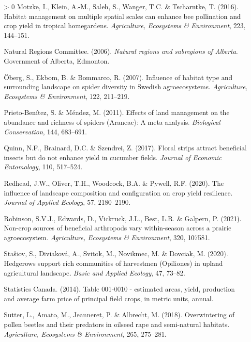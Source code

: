 \documentclass[]{elsarticle} %
\newlength{\cslhangindent}
\newenvironment{CSLReferences}[3] %
 {%
  \setlength{\parindent}{0pt}
  \ifodd #1 \everypar{\setlength{\hangindent}{\cslhangindent}}\ignorespaces\fi
  \ifnum #2 > 0
  \setlength{\parskip}{#2\baselineskip}
  \fi
 }%
 {}
\begin{document}
\begin{CSLReferences}{1}{0}
\leavevmode\hypertarget{ref-motzke2016}{}%
Motzke, I., Klein, A.-M., Saleh, S., Wanger, T.C. \& Tscharntke, T. (2016). Habitat management on multiple spatial scales can enhance bee pollination and crop yield in tropical homegardens. \emph{Agriculture, Ecosystems \& Environment}, 223, 144--151.

\leavevmode\hypertarget{ref-ABRegions2006}{}%
Natural Regions Committee. (2006). \emph{Natural regions and subregions of {Alberta}}. Government of Alberta, Edmonton.

\leavevmode\hypertarget{ref-oberg2007}{}%
Öberg, S., Ekbom, B. \& Bommarco, R. (2007). Influence of habitat type and surrounding landscape on spider diversity in {Swedish} agroecosystems. \emph{Agriculture, Ecosystems {\&} Environment}, 122, 211--219.

\leavevmode\hypertarget{ref-prietoBenitez2011}{}%
Prieto-Benítez, S. \& Méndez, M. (2011). Effects of land management on the abundance and richness of spiders ({Araneae}): A meta-analysis. \emph{Biological Conservation}, 144, 683--691.

\leavevmode\hypertarget{ref-quinn2017}{}%
Quinn, N.F., Brainard, D.C. \& Szendrei, Z. (2017). Floral strips attract beneficial insects but do not enhance yield in cucumber fields. \emph{Journal of Economic Entomology}, 110, 517--524.

\leavevmode\hypertarget{ref-redhead2020}{}%
Redhead, J.W., Oliver, T.H., Woodcock, B.A. \& Pywell, R.F. (2020). The influence of landscape composition and configuration on crop yield resilience. \emph{Journal of Applied Ecology}, 57, 2180--2190.

\leavevmode\hypertarget{ref-robinson2021}{}%
Robinson, S.V.J., Edwards, D., Vickruck, J.L., Best, L.R. \& Galpern, P. (2021). Non-crop sources of beneficial arthropods vary within-season across a prairie agroecosystem. \emph{Agriculture, Ecosystems {\&} Environment}, 320, 107581.

\leavevmode\hypertarget{ref-stasiov2020}{}%
Stašiov, S., Diviaková, A., Svitok, M., Novikmec, M. \& Dovciak, M. (2020). Hedgerows support rich communities of harvestmen ({Opiliones}) in upland agricultural landscape. \emph{Basic and Applied Ecology}, 47, 73--82.

\leavevmode\hypertarget{ref-statscan_canola2014}{}%
Statistics Canada. (2014). Table 001-0010 - estimated areas, yield, production and average farm price of principal field crops, in metric units, annual.

\leavevmode\hypertarget{ref-sutter2018b}{}%
Sutter, L., Amato, M., Jeanneret, P. \& Albrecht, M. (2018). Overwintering of pollen beetles and their predators in oilseed rape and semi-natural habitats. \emph{Agriculture, Ecosystems {\&} Environment}, 265, 275--281.


\end{CSLReferences}
\end{document}
